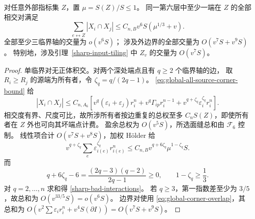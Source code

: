 \begin{lemma}[角交量的均匀可积性]\label{sharp-angle-integrability}
对任意外部指标集 \(Z\)，置 \(\mu=S(Z)/S\le1\)。
同一第六层中至少一端在 \(Z\) 的全部相交对满足
\begin{equation}\label{sharp-bad-interactions}
 \sum_{e\leftrightarrow Z}|X_i\cap X_j|
 \le C_{n,B}v^6S(\mu^{1/3}+v).
\end{equation}
全部至少三临界轴的交量为 \(o(v^6S)\)；
涉及外边界的全部交量为 \(O(v^7S+v^9S)\)。
特别地，涉及引理~\ref{sharp-input-tiling} 中 \(Z_v\) 的交量为 \(O(v^7S)\)。
\end{lemma}
\begin{proof}
单临界对无正体积交。对两个深处端点且有 \(q\ge2\) 个临界轴的边，
取 \(R_i\ge R_j\) 的源端为所有者，令 \(\zeta_q=q/(2q-1)\)。
\eqref{eq:global-all-source-corner-bound} 给
\[
 |X_i\cap X_j|\le C_{n,A_6}\!
 \left[v^q(\varepsilon_i+\varepsilon_j)r_i^n
 +v^q\Gamma_{ip}r_i^{n-1}
 +v^{q+\zeta_q}\varepsilon_i^{\zeta_q}r_i^n\right].
\]
相交度有界、尺度可比，故所涉所有者按边重复的总权至多
\(C_nS(Z)\)，即使所有者在 \(Z\) 外也可向其坏端点计费。
盈余总权为 \(O(v^5S)\)，所选面缝总和由 \(\mathcal F_6\) 控制。
线性项合计 \(O(v^7S+v^8S)\)，加权 H\"older 给
\[
 v^{q+\zeta_q}\sum_e\varepsilon_{i(e)}^{\zeta_q}r_{i(e)}^n
 \le C_{n,B}v^{q+6\zeta_q}\mu^{1-\zeta_q}S.
\]
而
\[
 q+6\zeta_q-6=\frac{(2q-3)(q-2)}{2q-1}\ge0,\qquad
 1-\zeta_q\ge\frac13.
\]
对 \(q=2,\ldots,n\) 求和得 \eqref{sharp-bad-interactions}。
若 \(q\ge3\)，第一指数差至少为 \(3/5\)，故总和为
\(O(v^{33/5}S)=o(v^6S)\)。
边界对使用 \eqref{eq:global-corner-overlap}，其总和为
\(O(v^2\sum\varepsilon_i r_i^n+v^4S(\partial I))
=O(v^7S+v^9S)\)。
\end{proof}

